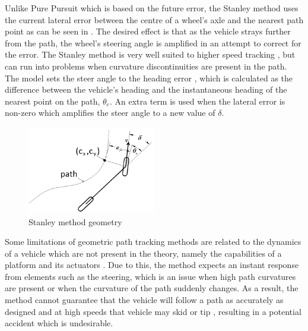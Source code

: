 \documentclass[main.tex]{subfiles}
\begin{document}
Unlike Pure Pursuit which is based on the future error, the Stanley method uses the current lateral error between the centre of a wheel's axle and the nearest path point \parencite{snider2009} as can be seen in . The desired effect is that as the vehicle strays further from the path, the wheel's steering angle is amplified in an attempt to correct for the error. The Stanley method is very well suited to higher speed tracking \parencite{snider2009}, but can run into problems when curvature discontinuities are present in the path. The model sets the steer angle to the heading error \parencite{Giesbrecht2005}, which is calculated as the difference between the vehicle's heading and the instantaneous heading of the nearest point on the path, $\theta_e$. An extra term is used when the lateral error is non-zero which amplifies the steer angle to a new value of $\delta$.
\begin{figure}[ht]
\includegraphics[width=0.5\textwidth]{2-LiteratureReview/stanleyMethod.png}
\centering
\caption[Stanley method geometry]{Stanley method geometry \parencite{snider2009}} 
\end{figure}


Some limitations of geometric path tracking methods are related to the dynamics of a vehicle which are not present in the theory, namely the capabilities of a platform and its actuators \parencite{coulter1992}. Due to this, the method expects an instant response from elements such as the steering, which is an issue when high path curvatures are present or when the curvature of the path suddenly changes. As a result, the method cannot guarantee that the vehicle will follow a path as accurately as designed and at high speeds that vehicle may skid or tip \parencite{coulter1992}, resulting in a potential accident which is undesirable.
\end{document}

